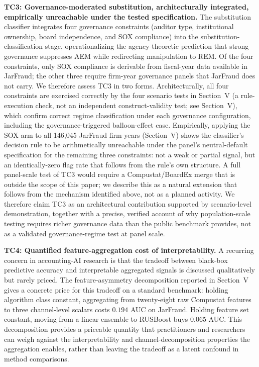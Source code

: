 \documentclass[12pt]{article}
\begin{document}
\textbf{TC3: Governance-moderated substitution, architecturally
integrated, empirically unreachable under the tested specification.}
The substitution classifier integrates
four governance constraints (auditor type, institutional ownership,
board independence, and SOX compliance) into the
substitution-classification stage, operationalizing the
agency-theoretic prediction \citep{jensen1976} that strong governance
suppresses AEM while redirecting manipulation to REM.  Of the four
constraints, only SOX compliance is derivable from fiscal-year data
available in JarFraud; the other three require firm-year governance
panels that JarFraud does not carry.  We therefore assess TC3 in two
forms.  Architecturally, all four constraints are exercised correctly by the
four scenario tests in Section~V (a rule-execution check, not an
independent construct-validity test; see Section~V), which confirm correct
regime classification under each governance configuration, including the
governance-triggered balloon-effect case.  Empirically, applying the
SOX arm to all 146{,}045 JarFraud firm-years (Section~V) shows the
classifier's decision rule to be arithmetically unreachable under the
panel's neutral-default specification for the remaining three
constraints: not a weak or partial signal, but an identically-zero
flag rate that follows from the rule's own structure.  A full
panel-scale test of TC3 would require a Compustat/BoardEx merge that is
outside the scope of this paper; we describe this as a natural
extension that follows from the mechanism identified above, not as a
planned activity.  We therefore claim TC3 as an architectural
contribution supported by scenario-level demonstration, together with
a precise, verified account of why population-scale testing requires
richer governance data than the public benchmark provides, not as a
validated governance-regime test at panel scale.

\textbf{TC4: Quantified feature-aggregation cost of interpretability.}
A recurring concern in accounting-AI research is that the tradeoff
between black-box predictive accuracy and interpretable aggregated
signals is discussed qualitatively but rarely priced.  The
feature-asymmetry decomposition reported in Section~V gives a concrete
price for this tradeoff on a standard benchmark: holding algorithm class
constant, aggregating from twenty-eight raw Compustat features to three
channel-level scalars costs $0.194$ AUC on JarFraud.  Holding feature set
constant, moving from a linear ensemble to RUSBoost buys $0.065$ AUC.
This decomposition provides a priceable quantity that practitioners
and researchers can weigh against the interpretability and
channel-decomposition properties the aggregation enables, rather than
leaving the tradeoff as a latent confound in method comparisons.
\end{document}
